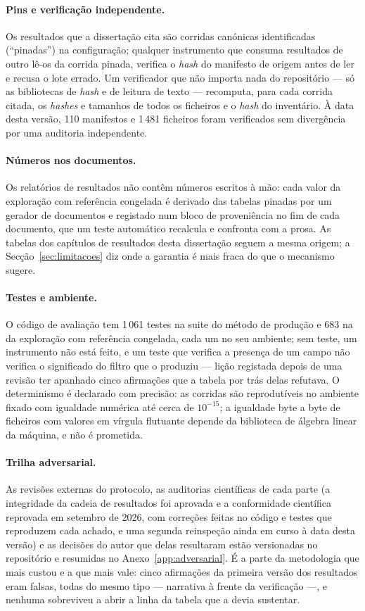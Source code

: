 \paragraph{Pins e verificação independente.} Os resultados que a
dissertação cita são corridas canónicas identificadas (``pinadas'') na
configuração; qualquer instrumento que consuma resultados de outro lê-os
da corrida pinada, verifica o \emph{hash} do manifesto de origem antes de
ler e recusa o lote errado. Um verificador que não importa nada do
repositório --- só as bibliotecas de \emph{hash} e de leitura de texto ---
recomputa, para cada corrida citada, os \emph{hashes} e tamanhos de todos
os ficheiros e o \emph{hash} do inventário. À data desta versão, 110
manifestos e 1\,481 ficheiros foram verificados sem divergência por uma
auditoria independente.

\paragraph{Números nos documentos.} Os relatórios de resultados não
contêm números escritos à mão: cada valor da exploração com referência
congelada é derivado das tabelas pinadas por um gerador de documentos e
registado num bloco de proveniência no fim de cada documento, que um teste
automático recalcula e confronta com a prosa. As tabelas dos capítulos de
resultados desta dissertação seguem a mesma origem; a Secção~\ref{sec:limitacoes}
diz onde a garantia é mais fraca do que o mecanismo sugere.

\paragraph{Testes e ambiente.} O código de avaliação tem 1\,061 testes na
suite do método de produção e 683 na da exploração com referência
congelada, cada um no seu ambiente; sem teste, um instrumento não está
feito, e um teste que verifica a presença de um campo não verifica o
significado do filtro que o produziu --- lição registada depois de uma
revisão ter apanhado cinco afirmações que a tabela por trás delas refutava.
O determinismo é declarado com precisão: as corridas são reprodutíveis no
ambiente fixado com igualdade numérica até cerca de $10^{-15}$; a igualdade
byte a byte de ficheiros com valores em vírgula flutuante depende da
biblioteca de álgebra linear da máquina, e não é prometida.

\paragraph{Trilha adversarial.} As revisões externas do protocolo, as
auditorias científicas de cada parte (a integridade da cadeia de
resultados foi aprovada e a conformidade científica reprovada em setembro
de 2026, com correções feitas no código e testes que reproduzem cada
achado, e uma segunda reinspeção ainda em curso à data desta versão) e as
decisões do autor que delas resultaram estão versionadas no repositório e
resumidas no Anexo~\ref{app:adversarial}. É a parte da metodologia que
mais custou e a que mais vale: cinco afirmações da primeira versão dos
resultados eram falsas, todas do mesmo tipo --- narrativa à frente da
verificação ---, e nenhuma sobreviveu a abrir a linha da tabela que a
devia sustentar.
